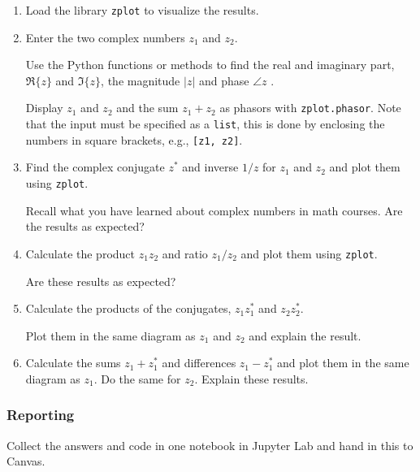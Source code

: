 \begin{enumerate}[1)]
	\item Load the library \verb|zplot| to visualize the results.

	\item Enter the two complex numbers $z_1$ and $z_2$. 
	
		Use the Python functions or methods to find the real and imaginary part, $\Re\{z\}$ and $\Im\{z\}$, the magnitude $|z|$ and phase $\angle z$ .
	
		Display $z_1$ and $z_2$ and the sum $z_1+z_2$ as phasors with \verb|zplot.phasor|. 		
		Note that the input must be specified as a \verb|list|, this is done by enclosing the numbers in square brackets, e.g., \verb|[z1, z2]|.

	\item Find the complex conjugate $z^*$ and inverse $1/z$ for $z_1$ and $z_2$ and plot them using \verb|zplot|.
	
		Recall what you have learned about complex numbers in math courses. Are the results as expected?
			
	\item Calculate the product $z_1 z_2$ and ratio $z_1/z_2$ and plot them using \verb|zplot|. 
	
		Are these results as expected?

	\item Calculate the products of the conjugates, $z_1 z_1^*$ and $z_2 z_2^*$. 
	
	Plot them in the same diagram as $z_1$ and $z_2$ and explain the result.

	\item Calculate the sums $z_1+z_1^*$ and differences $z_1-z_1^*$ and plot them in the same diagram as $z_1$. Do the same for $z_2$. Explain these results.
		
\end{enumerate}

\subsubsection*{Reporting}	
Collect the answers and code in one notebook in Jupyter Lab and hand in this to Canvas.
		
		
